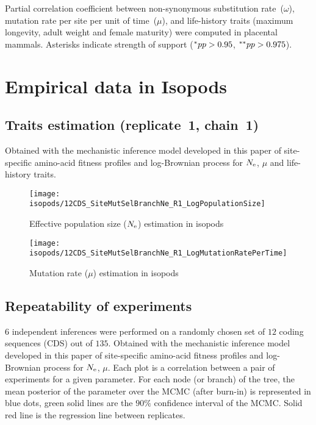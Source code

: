 \begin{table}[H]
    
    \caption[Partial correlation coefficient matrix in mammals ($\omega$)]{
        Partial correlation coefficient between {non-synonymous} {substitution} rate~($\omega$), mutation rate per site per unit of time~($\mu$), and life-history traits (maximum longevity, adult weight and female maturity) were computed in placental mammals.
        Asterisks indicate strength of support ($\smash{^{*}} pp > 0.95$, $\smash{^{**}} pp > 0.975$).}
\end{table}


\section{Empirical data in Isopods}
\label{sec:empirical-data-in-isopods}

\subsection{Traits estimation (replicate~1, chain~1)}
Obtained with the mechanistic inference model developed in this paper of site-specific amino-acid fitness profiles and log-Brownian process for $\Ne$, $\mu$ and life-history traits.

\begin{figure}[H]
    \centering
    \texttt{[image: isopods/12CDS\_SiteMutSelBranchNe\_R1\_LogPopulationSize]}
    \caption[$\Ne$ estimation in isopods]{Effective population size ($\Ne$) estimation in isopods}
\end{figure}

\begin{figure}[H]
    \centering
    \texttt{[image: isopods/12CDS\_SiteMutSelBranchNe\_R1\_LogMutationRatePerTime]}
    \caption[Mutation rate estimation in isopods]{Mutation rate ($\mu$) estimation in isopods}
\end{figure}

\subsection{Repeatability of experiments}
\label{subsec:repeatability-of-experiments-isopods}
$6$ independent inferences were performed on a randomly chosen set of $12$ coding sequences ({CDS}) out of $135$.
Obtained with the mechanistic inference model developed in this paper of site-specific amino-acid fitness profiles and log-Brownian process for $\Ne$, $\mu$.
Each plot is a correlation between a pair of experiments for a given parameter.
For each node (or branch) of the tree, the mean {posterior} of the parameter over the {MCMC} (after burn-in) is represented in blue dots, green solid lines are the $90\%$ confidence interval of the {MCMC}.
Solid red line is the regression line between replicates.

